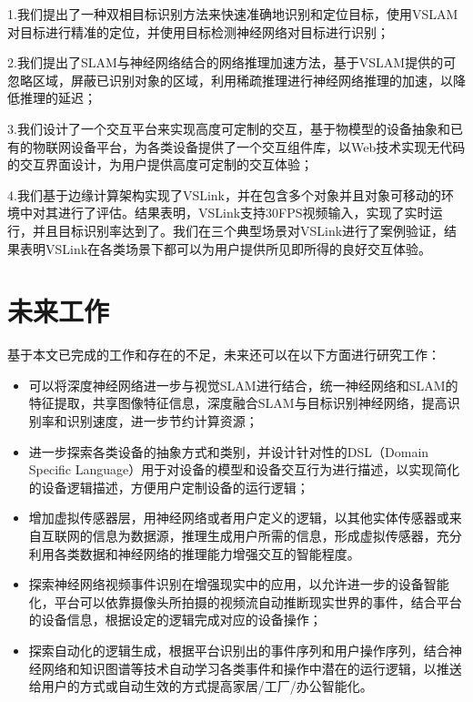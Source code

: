 1.我们提出了一种双相目标识别方法来快速准确地识别和定位目标，使用VSLAM对目标进行精准的定位，并使用目标检测神经网络对目标进行识别；

2.我们提出了SLAM与神经网络结合的网络推理加速方法，基于VSLAM提供的可忽略区域，屏蔽已识别对象的区域，利用稀疏推理进行神经网络推理的加速，以降低推理的延迟；

3.我们设计了一个交互平台来实现高度可定制的交互，基于物模型的设备抽象和已有的物联网设备平台，为各类设备提供了一个交互组件库，以Web技术实现无代码的交互界面设计，为用户提供高度可定制的交互体验；

4.我们基于边缘计算架构实现了VSLink，并在包含多个对象并且对象可移动的环境中对其进行了评估。结果表明，VSLink支持30FPS视频输入，实现了实时运行，并且目标识别率达到了{\acc}。我们在三个典型场景对VSLink进行了案例验证，结果表明VSLink在各类场景下都可以为用户提供所见即所得的良好交互体验。

\section{未来工作}
基于本文已完成的工作和存在的不足，未来还可以在以下方面进行研究工作：
\begin{itemize}
	\item 可以将深度神经网络进一步与视觉SLAM进行结合，统一神经网络和SLAM的特征提取，共享图像特征信息，深度融合SLAM与目标识别神经网络，提高识别率和识别速度，进一步节约计算资源；
	\item 进一步探索各类设备的抽象方式和类别，并设计针对性的DSL（Domain Specific Language）用于对设备的模型和设备交互行为进行描述，以实现简化的设备逻辑描述，方便用户定制设备的运行逻辑；
	\item 增加虚拟传感器层，用神经网络或者用户定义的逻辑，以其他实体传感器或来自互联网的信息为数据源，推理生成用户所需的信息，形成虚拟传感器，充分利用各类数据和神经网络的推理能力增强交互的智能程度。
	\item 探索神经网络视频事件识别在增强现实中的应用，以允许进一步的设备智能化，平台可以依靠摄像头所拍摄的视频流自动推断现实世界的事件，结合平台的设备信息，根据设定的逻辑完成对应的设备操作；
	\item 探索自动化的逻辑生成，根据平台识别出的事件序列和用户操作序列，结合神经网络和知识图谱等技术自动学习各类事件和操作中潜在的运行逻辑，以推送给用户的方式或自动生效的方式提高家居/工厂/办公智能化。
\end{itemize}


